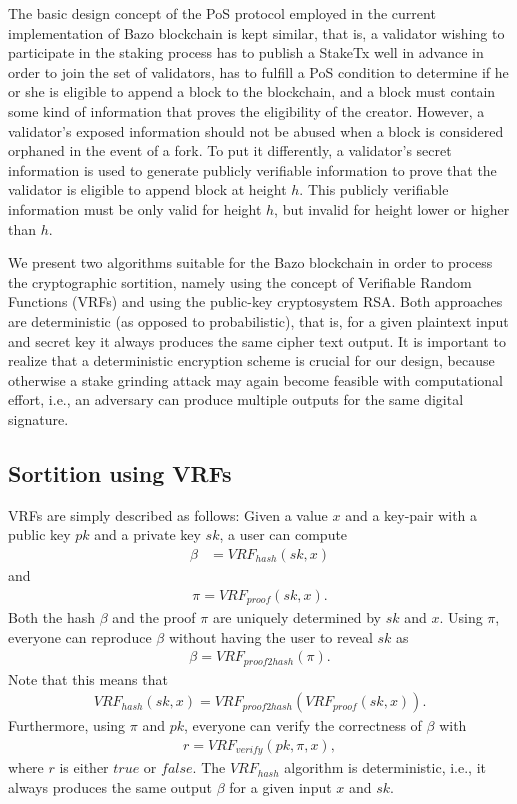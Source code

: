 \documentclass[12pt,a4]{article}
\begin{document}
The basic design concept of the PoS protocol employed in the current implementation of Bazo blockchain is kept similar, that is, a validator wishing to participate in the staking process has to publish a StakeTx well in advance in order to join the set of validators, has to fulfill a PoS condition to determine if he or she is eligible to append a block to the blockchain, and a block must contain some kind of information that proves the eligibility of the creator. However, a validator's exposed information should not be abused when a block is considered orphaned in the event of a fork. To put it differently, a validator's secret information is used to generate publicly verifiable information to prove that the validator is eligible to append block at height $h$. This publicly verifiable information must be only valid for height $h$, but invalid for height lower or higher than $h$. 

We present two algorithms suitable for the Bazo blockchain in order to process the cryptographic sortition, namely using the concept of Verifiable Random Functions (VRFs) and using the public-key cryptosystem RSA. Both approaches are deterministic (as opposed to probabilistic), that is, for a given plaintext input and secret key it always produces the same cipher text output. It is important to realize that a deterministic encryption scheme is crucial for our design, because otherwise a stake grinding attack may again become feasible with computational effort, i.e., an adversary can produce multiple outputs for the same digital signature. 

\subsection{Sortition using VRFs}

VRFs \cite{Micali99, Goldberg17} are simply described as follows: Given a value $x$ and a key-pair with a public key $pk$ and a private key $sk$, a user can compute
\begin{align}
  \beta &= VRF_{hash}(sk, x)
\end{align}
and
\begin{gather}
  \pi = VRF_{proof}(sk, x).
\end{gather}
Both the hash $\beta$ and the proof $\pi$ are uniquely determined by $sk$ and $x$. Using $\pi$, everyone can reproduce $\beta$ without having the user to reveal $sk$ as
\begin{gather}
  \beta = VRF_{proof2hash}(\pi).
\end{gather}
Note that this means that
\begin{gather}
  VRF_{hash}(sk, x) = VRF_{proof2hash}(VRF_{proof}(sk, x)).
\end{gather}
Furthermore, using $\pi$ and $pk$, everyone can verify the correctness of $\beta$ with
\begin{gather}
  r = VRF_{verify}(pk, \pi, x),
\end{gather}
where $r$ is either $true$ or $false$. The $VRF_{hash}$ algorithm is deterministic, i.e., it always produces the same output $\beta$ for a given input $x$ and $sk$.
\end{document}
